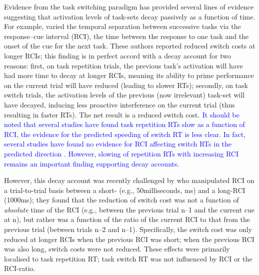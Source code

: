 \documentclass[a4paper, man, natbib]{apa6}
\newcommand{\jg}[1]{\textcolor{blue}{$^{\textrm{}}${#1}}}
\begin{document}
Evidence from the task switching paradigm has provided several lines of evidence suggesting that activation levels of task-sets decay passively as a function of time. For example, \cite{Meiran2000a} varied the temporal separation between successive tasks via the response--cue interval (RCI), the time between the response to one task and the onset of the cue for the next task. These authors reported reduced switch costs at longer RCIs; this finding is in perfect accord with a decay account for two reasons: first, on task repetition trials, the previous task's activation will have had more time to decay at longer RCIs, meaning its ability to prime performance on the current trial will have reduced (leading to slower RTs); secondly, on task switch trials, the activation levels of the previous (now irrelevant) task-set will have decayed, inducing less proactive interference on the current trial (thus resulting in faster RTs). The net result is a reduced switch cost. \jg{It should be noted that several studies have found task repetition RTs slow as a function of RCI, the evidence for the predicted speeding of switch RT is less clear. In fact, several studies have found no evidence for RCI affecting switch RTs in the predicted direction \citep{Altmann2005, Horoufchin2011a, Meiran2000a}. However, slowing of repetition RTs with increasing RCI remains an important finding supporting decay accounts.}

However, this decay account was recently challenged by \cite{Horoufchin2011a} who manipulated RCI on a trial-to-trial basis between a short- (e.g., 50milliseconds, ms) and a long-RCI (1000ms); they found that the reduction of switch cost was not a function of \emph{absolute} time of the RCI (e.g., between the previous trial n--1 and the current cue at n), but rather was a function of the ratio of the current RCI to that from the previous trial (between trials n--2 and n--1). Specifically, the switch cost was only reduced at longer RCIs when the previous RCI was short; when the previous RCI was also long, switch costs were not reduced. These effects were primarily localised to task repetition RT; task switch RT was not influenced by RCI or the RCI-ratio.
\end{document}
